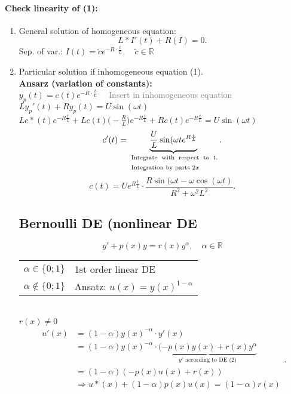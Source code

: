 \documentclass[]{article}
\begin{document}
\paragraph{Check linearity of (1):} 
\begin{enumerate}
	\renewcommand{\labelenumi}{\alph{enumi})}
	\item General solution of homogeneous equation: \[
	L*I'(t)+R(I) =0
	.\] 
	Sep. of var.: $I(t)=\tilde c e ^{-R \cdot \frac{t}{L}},\quad\tilde c\in \mathbb R$
\item Particular solution if inhomogeneous equation (1).\\
	\textbf{Ansarz (variation of constants):}\\
	$y_p(t)=c(t) e ^{-R \cdot \frac{t}{L}}\quad$ \textcolor{gray}{Insert in inhomogeneous equation}\\
	$Ly_p'(t)+Ry_p(t)=U\sin(\omega t)$\\
	$Lc*(t)e ^{-R \frac{t}{L}}+Lc(t)\big(- \frac{R}{L}\big) e ^{-R \frac{t}{L}}+Rc(t) e ^{-R \frac{t}{L}}=U\sin(\omega t)$
	\[
	c'(t)= \underbrace{ \frac{U}{L}\sin (\omega t e ^{R \frac{t}{L}}}_\text{ \parbox{13em}{Integrate with respect to $t$. Integration by parts $2x$}}	.\]
	\[
	c(t)=U e ^{R \frac{t}{L}} \cdot \frac{R \sin (\omega t -\omega \cos(\omega t)}{R ^{2}+ \omega ^{2} L ^{2}}
	.\]
\subsection{Bernoulli DE (nonlinear DE}
\begin{equation}
y'+p(x)y=r(x)y ^{\alpha},\quad \alpha \in \mathbb R
\end{equation}
\begin{tabular}{@{}l l}
	$\alpha\in \{0;1\}$ & 1st order linear DE\\
$\alpha\not\in \{0;1\}$ & Ansatz: $u(x)=y(x) ^{1-\alpha}$
\end{tabular}\\
$r(x)\not=0$
\[
\begin{split}
	u'(x) & = (1-\alpha) y(x) ^{-\alpha} \cdot y'(x)\\
	      &=(1-\alpha) y(x) ^{-\alpha} \cdot \underbrace{(-p(x)y(x)+r(x)y ^{\alpha}}_\text{$y'$ according to DE (2)}\\
	      &= (1-\alpha) (-p(x)u(x)+r(x))\\
	      &\Rightarrow u*(x)  +(1-\alpha)p(x)u(x)=(1-\alpha)r(x)\\
\end{split}
.\]

\end{enumerate}
\end{document}
